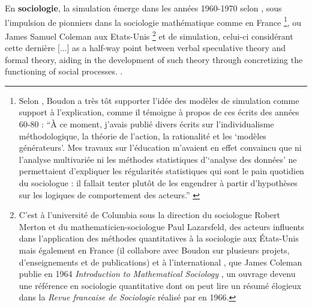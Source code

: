 
En \textbf{sociologie}, la simulation émerge dans les années 1960-1970 selon \textcite[50]{Manzo2005}, sous l'impulsion de pionniers dans la sociologie mathématique comme \textcite{Boudon1967} en France \footnote{Selon \textcite[61]{Manzo2005}, Boudon a très tôt supporter l'idée des modèles de simulation comme support à l'explication, comme il témoigne à propos de ces écrits des années 60-80 : \enquote{À ce moment, j’avais publié divers écrits sur l’individualisme méthodologique, la théorie de l’action, la rationalité et les \enquote{modèles générateurs}. Mes travaux sur l’éducation m’avaient en effet convaincu que ni l’analyse multivariée ni les méthodes statistiques d’\enquote{analyse des données} ne permettaient d’expliquer les régularités statistiques qui sont le pain quotidien du sociologue : il fallait tenter plutôt de les engendrer à partir d’hypothèses sur les logiques de comportement des acteurs.} \autocite[391]{Boudon2003}}, ou James Samuel Coleman aux Etats-Unis \footnote{C'est à l'université de Columbia sous la direction du sociologue Robert Merton et du mathematicien-sociologue Paul Lazarsfeld, des acteurs influents dans l'application des méthodes quantitatives à la sociologie \autocite{Lazarsfeld1954} aux États-Unis mais également en France (il collabore avec Boudon sur plusieurs projets, d'enseignements et de publications) et à l'international \autocite{Lecuyer2002}, que James Coleman publie en 1964 \textit{Introduction to Mathematical Sociology} \autocite{Coleman1964}, un ouvrage devenu une référence en sociologie quantitative dont on peut lire un résumé élogieux dans la \textit{Revue francaise de Sociologie} réalisé par \textcite{Boudon1966} en 1966.} et de simulation, celui-ci considérant cette dernière {[...] as a half-way point between verbal speculative theory and formal theory, aiding in the development of such theory through concretizing the functioning of social processes. \autocite[36]{Guetzkow1972}}.

